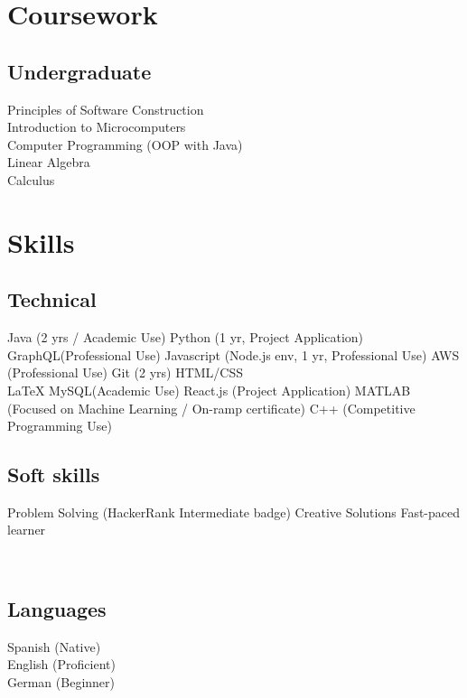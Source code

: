 \documentclass[]{resume-openfont}
\begin{document}
\begin{minipage}[t]{0.33\textwidth}

\section{Coursework}

\subsection{Undergraduate}
Principles of Software Construction  \\
Introduction to Microcomputers \\
Computer Programming (OOP with Java)\\
Linear Algebra \\
Calculus


\section{Skills}
\subsection{Technical}
Java (2 yrs / Academic Use) \textbullet{} Python (1 yr, Project Application) \textbullet{} GraphQL(Professional Use)
\textbullet{} Javascript (Node.js env, 1 yr, Professional Use)
\textbullet{} AWS (Professional Use)\textbullet{} Git (2 yrs) \textbullet{} HTML/CSS  \\
\LaTeX \textbullet{} MySQL(Academic Use)
\textbullet{} React.js (Project Application)   \textbullet{} MATLAB (Focused on Machine Learning / On-ramp certificate)\textbullet{} C++ (Competitive Programming Use)
 \sectionsep\\
\subsection{Soft skills}

Problem Solving (HackerRank Intermediate badge) \textbullet{} Creative Solutions \textbullet{} Fast-paced learner

\sectionsep\\


\subsection{Languages}

Spanish (Native)\\
English (Proficient)\\
German  (Beginner)\\

%
%

\end{minipage}
\end{document}
